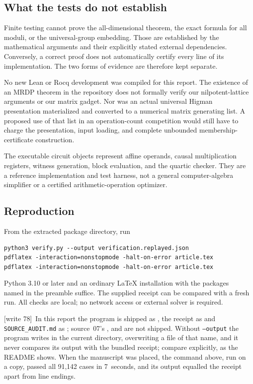 \documentclass[11pt,letterpaper]{article}
\theoremstyle{definition}
\theoremstyle{remark}
\newcommand{\wtagb}{\textup{[write 78]}}
\begin{document}
\subsection{What the tests do not establish}
Finite testing cannot prove the all-dimensional theorem, the exact formula for all moduli, or the universal-group embedding. Those are established by the mathematical arguments and their explicitly stated external dependencies. Conversely, a correct proof does not automatically certify every line of its implementation. The two forms of evidence are therefore kept separate.

No new Lean or Rocq development was compiled for this report. The existence of an MRDP theorem in the repository does not formally verify our nilpotent-lattice arguments or our matrix gadget. Nor was an actual universal Higman presentation materialized and converted to a numerical matrix generating list. A proposed use of that list in an operation-count competition would still have to charge the presentation, input loading, and complete unbounded membership-certificate construction.

The executable circuit objects represent affine operands, causal multiplication registers, witness generation, block evaluation, and the quartic checker. They are a reference implementation and test harness, not a general computer-algebra simplifier or a certified arithmetic-operation optimizer.

\subsection{Reproduction}
From the extracted package directory, run
\begin{lstlisting}
python3 verify.py --output verification.replayed.json
pdflatex -interaction=nonstopmode -halt-on-error article.tex
pdflatex -interaction=nonstopmode -halt-on-error article.tex
\end{lstlisting}
Python 3.10 or later and an ordinary LaTeX installation with the packages named in the preamble suffice. The supplied receipt can be compared with a fresh run. All checks are local; no network access or external solver is required.

\wtagb\ In this report the program is shipped as , the receipt as  and \texttt{SOURCE\_AUDIT.md} as ; source~07's ,  and  are not shipped. Without \texttt{--output} the program writes  in the current directory, overwriting a file of that name, and it never compares its output with the bundled receipt; compare explicitly, as the README shows. When the manuscript was placed, the command above, run on a copy, passed all 91,142 cases in 7~seconds, and its output equalled the receipt apart from line endings.
\end{document}
